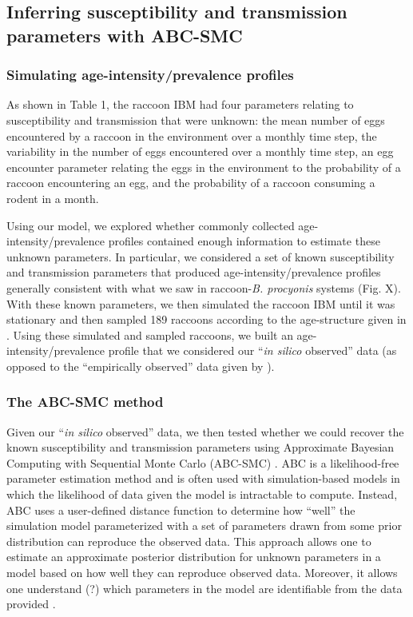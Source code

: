 \documentclass[11pt]{article}
\begin{document}
\subsection{Inferring susceptibility and transmission parameters with ABC-SMC}

\subsubsection{Simulating age-intensity/prevalence profiles}

As shown in Table 1, the raccoon IBM had four parameters relating to susceptibility and transmission that were unknown: 
the mean number of eggs encountered by a raccoon in the environment over
a monthly time step, the variability in the number of eggs encountered
over a monthly time step, an egg encounter parameter relating the eggs
in the environment to the probability of a raccoon encountering an egg, and
the probability of a raccoon consuming a rodent in a month.

Using our model, we explored whether commonly collected age-intensity/prevalence profiles contained enough information to estimate these unknown parameters.  In particular, we considered a set of known susceptibility and transmission parameters that produced age-intensity/prevalence profiles generally consistent with what we saw in raccoon-\emph{B. procyonis} systems (Fig. X).  With these known parameters, we then simulated the raccoon IBM until it was stationary and then sampled 189 raccoons according to the age-structure given in \cite{Weinstein2016}.  Using these simulated and sampled raccoons, we built an age-intensity/prevalence profile that we considered our ``\emph{in silico} observed'' data (as opposed to the ``empirically observed'' data given by \cite{Weinstein2016}).

\subsubsection{The ABC-SMC method}

Given our ``\emph{in silico} observed'' data, we then tested whether we could recover the known susceptibility and transmission parameters using Approximate Bayesian Computing
with Sequential Monte Carlo (ABC-SMC) \citep{Sisson2009,Toni2009,Beaumont2010,Kosmala2015}. ABC is a likelihood-free parameter estimation method and is often used with simulation-based
models in which the likelihood of data given the model is
intractable to compute. Instead, ABC uses a user-defined distance
function to determine how ``well'' the simulation model parameterized
with a set of parameters drawn from some prior distribution can
reproduce the observed data. This approach allows one to estimate an
approximate posterior distribution for unknown parameters in a model based
on how well they can reproduce observed data.  Moreover, it allows one understand (?) which parameters in the model are identifiable from the data provided \citep{Toni2009}.
\end{document}
